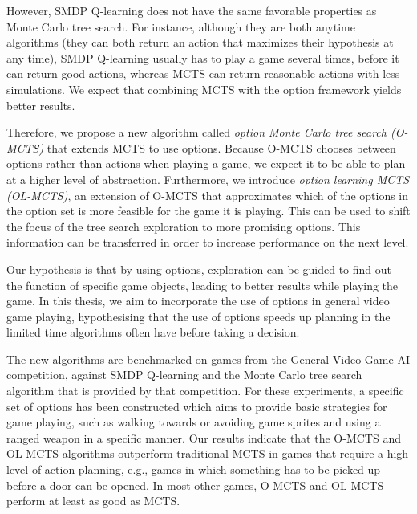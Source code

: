 However, SMDP Q-learning does not have the same favorable properties as Monte Carlo tree
search. For instance, although they are both anytime algorithms (they can both
return an action that maximizes their hypothesis at any time), SMDP Q-learning
usually has to play a game several times, before it can return good actions,
whereas MCTS can return reasonable actions with less simulations.  We expect
that combining MCTS with the option framework yields better results.

Therefore, we propose a new algorithm called \emph{option Monte Carlo tree
search (O-MCTS)} that extends MCTS to use options. Because O-MCTS chooses
between options rather than actions when playing a game, we expect it to be able
to plan at a higher level of abstraction. Furthermore, we introduce \emph{option
learning MCTS (OL-MCTS)}, an extension of O-MCTS that approximates which of the
options in the option set is more feasible for the game it is playing. This can
be used to shift the focus of the tree search exploration to more promising
options. This information can be transferred in order to increase performance on
the next level.

Our hypothesis is that by using options, exploration can be guided to find out
the function of specific game objects, leading to better results while playing
the game. In this thesis, we aim to incorporate the use of options in general
video game playing, hypothesising that the use of options speeds up planning in
the limited time algorithms often have before taking a decision. 

The new algorithms are benchmarked on games from the General Video Game AI
competition, against SMDP Q-learning and the Monte Carlo tree search algorithm
that is provided by that competition. For these experiments, a specific set of
options has been constructed which aims to provide basic strategies for game
playing, such as walking towards or avoiding game sprites and using a ranged
weapon in a specific manner. Our results indicate that the O-MCTS and OL-MCTS
algorithms outperform traditional MCTS in games that require a high level of
action planning, e.g., games in which something has to be picked up before a
door can be opened. In most other games, O-MCTS and OL-MCTS perform at least as
good as MCTS.
